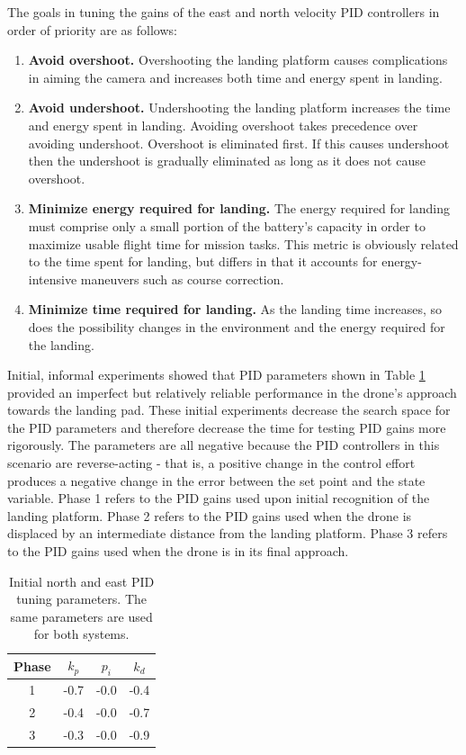 The goals in tuning the gains of the east and north velocity PID controllers in order of priority are as follows:
\begin{enumerate}
    \item \textbf{Avoid overshoot.} Overshooting the landing platform causes complications in aiming the camera and increases both time and energy spent in landing.
    \item \textbf{Avoid undershoot.} Undershooting the landing platform increases the time and energy spent in landing. Avoiding overshoot takes precedence over avoiding undershoot. Overshoot is eliminated first. If this causes undershoot then the undershoot is gradually eliminated as long as it does not cause overshoot.
    \item \textbf{Minimize energy required for landing.} The energy required for landing must comprise only a small portion of the battery's capacity in order to maximize usable flight time for mission tasks. This metric is obviously related to the time spent for landing, but differs in that it accounts for energy-intensive maneuvers such as course correction.
    \item \textbf{Minimize time required for landing.} As the landing time increases, so does the possibility changes in the environment and the energy required for the landing.
\end{enumerate}

Initial, informal experiments showed that PID parameters shown in Table \ref{tab:initial_parameters} provided an imperfect but relatively reliable performance in the drone's approach towards the landing pad. These initial experiments decrease the search space for the PID parameters and therefore decrease the time for testing PID gains more rigorously. The parameters are all negative because the PID controllers in this scenario are reverse-acting - that is, a positive change in the control effort produces a negative change in the error between the set point and the state variable. Phase 1 refers to the PID gains used upon initial recognition of the landing platform. Phase 2 refers to the PID gains used when the drone is displaced by an intermediate distance from the landing platform. Phase 3 refers to the PID gains used when the drone is in its final approach.

\begin{table}[ht]
    \centering
    \begin{tabular}{|c|c|c|c|}
    \hline
        Phase & $k_p$ & $p_i$ & $k_d$ \\\hline
        1 & -0.7 & -0.0 & -0.4 \\\hline
        2 & -0.4 & -0.0 & -0.7 \\\hline
        3 & -0.3 & -0.0 & -0.9 \\\hline
    \end{tabular}
    \caption{Initial north and east PID tuning parameters. The same parameters are used for both systems.}
    \label{tab:initial_parameters}
\end{table}

